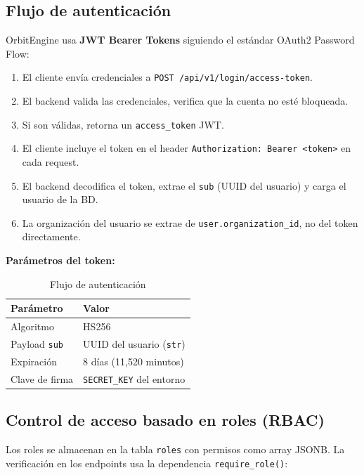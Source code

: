 \subsection{Flujo de autenticación}\label{flujo-de-autenticaciuxf3n}

OrbitEngine usa \textbf{JWT Bearer Tokens} siguiendo el estándar OAuth2 Password Flow:

\begin{enumerate}
\def\labelenumi{\arabic{enumi}.}
\tightlist
\item
  El cliente envía credenciales a \texttt{POST\ /api/v1/login/access-token}.
\item
  El backend valida las credenciales, verifica que la cuenta no esté bloqueada.
\item
  Si son válidas, retorna un \texttt{access\_token} JWT.
\item
  El cliente incluye el token en el header \texttt{Authorization:\ Bearer\ \textless{}token\textgreater{}} en cada request.
\item
  El backend decodifica el token, extrae el \texttt{sub} (UUID del usuario) y carga el usuario de la BD.
\item
  La organización del usuario se extrae de \texttt{user.organization\_id}, no del token directamente.
\end{enumerate}

\textbf{Parámetros del token:}

\begin{longtable}[]{@{}ll@{}}
\caption[Flujo de autenticación]{Flujo de autenticación}\tabularnewline
\toprule\noalign{}
Parámetro & Valor \\
\midrule\noalign{}
\endhead
\bottomrule\noalign{}
\endlastfoot
Algoritmo & HS256 \\
Payload \texttt{sub} & UUID del usuario (\texttt{str}) \\
Expiración & 8 días (11,520 minutos) \\
Clave de firma & \texttt{SECRET\_KEY} del entorno \\
\end{longtable}

\subsection{Control de acceso basado en roles (RBAC)}\label{control-de-acceso-basado-en-roles-rbac}

Los roles se almacenan en la tabla \texttt{roles} con permisos como array JSONB. La verificación en los endpoints usa la dependencia \texttt{require\_role()}:

